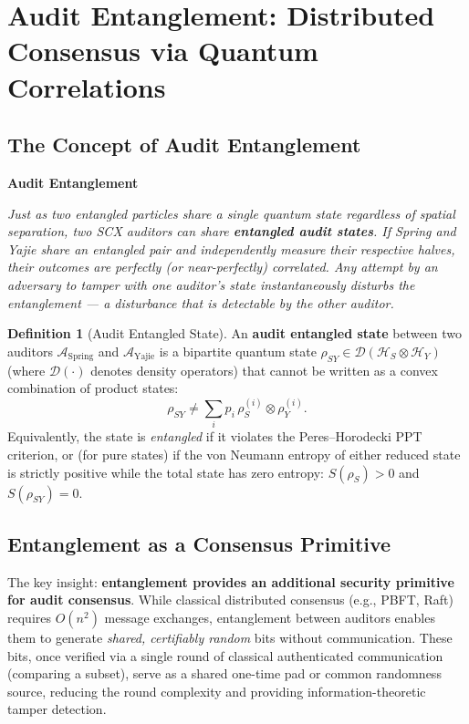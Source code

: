 \documentclass[11pt,a4paper]{article}
\theoremstyle{plain}
\theoremstyle{definition}
\newtheorem{definition}[theorem]{Definition}
\theoremstyle{remark}
\newenvironment{bilingual}[2]{%
  \medskip\noindent\textbf{#1}\par\noindent\textit{#2}\par\smallskip
}{}
\newcommand{\cH}{\mathcal{H}}
\newcommand{\cA}{\mathcal{A}}
\newcommand{\cD}{\mathcal{D}}
\begin{document}
\section{Audit Entanglement: Distributed Consensus via Quantum Correlations}
\label{sec:entanglement}

\subsection{The Concept of Audit Entanglement}
\label{sec:ent_concept}

\begin{bilingual}
{Audit Entanglement}
{Just as two entangled particles share a single quantum state regardless of
spatial separation, two SCX auditors can share \textbf{entangled audit states}.
If Spring and Yajie share an entangled pair and independently measure their
respective halves, their outcomes are perfectly (or near-perfectly) correlated.
Any attempt by an adversary to tamper with one auditor's state instantaneously
disturbs the entanglement — a disturbance that is detectable by the other auditor.}
\end{bilingual}

\begin{definition}[Audit Entangled State]
\label{def:audit_entangled}
An \textbf{audit entangled state} between two auditors $\cA_{\text{Spring}}$
and $\cA_{\text{Yajie}}$ is a bipartite quantum state
$\rho_{SY} \in \cD(\cH_S \otimes \cH_Y)$ (where $\cD(\cdot)$ denotes density
operators) that cannot be written as a convex combination of product states:
\[
\rho_{SY} \neq \sum_i p_i \, \rho_S^{(i)} \otimes \rho_Y^{(i)}.
\]
Equivalently, the state is \emph{entangled} if it violates the
Peres--Horodecki PPT criterion, or (for pure states) if the von Neumann
entropy of either reduced state is strictly positive while the total state
has zero entropy: $S(\rho_S) > 0$ and $S(\rho_{SY}) = 0$.
\end{definition}

\subsection{Entanglement as a Consensus Primitive}
\label{sec:ent_consensus}

The key insight: \textbf{entanglement provides an additional security primitive
for audit consensus}. While classical distributed consensus (e.g.,
PBFT, Raft) requires $O(n^2)$ message exchanges, entanglement between
auditors enables them to generate \emph{shared, certifiably random} bits
without communication. These bits, once verified via a single round of
classical authenticated communication (comparing a subset), serve as a
shared one-time pad or common randomness source, reducing the round
complexity and providing information-theoretic tamper detection.
\end{document}
